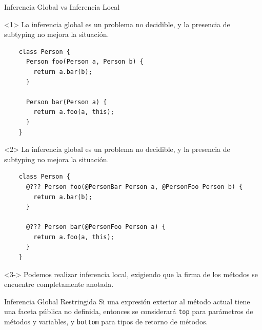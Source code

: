 \documentclass[aspectratio=169,10pt]{beamer}
\begin{document}
\begin{frame}[fragile]{Inferencia Global vs Inferencia Local}

  \begin{onlyenv}<1>
		\only<2-|handout:0>{\stepcounter{framenumber}}
    La inferencia global es un problema no decidible, y la presencia de subtyping no mejora la situación.
    \begin{lstlisting}
    class Person {
      Person foo(Person a, Person b) {
        return a.bar(b);
      }

      Person bar(Person a) {
        return a.foo(a, this);
      }
    }
    \end{lstlisting}
  \end{onlyenv}
  \begin{onlyenv}<2>
    La inferencia global es un problema no decidible, y la presencia de subtyping no mejora la situación.
    \begin{lstlisting}
    class Person {
      @??? Person foo(@PersonBar Person a, @PersonFoo Person b) {
        return a.bar(b);
      }

      @??? Person bar(@PersonFoo Person a) {
        return a.foo(a, this);
      }
    }
    \end{lstlisting}
  \end{onlyenv}

  \begin{onlyenv}<3->
    Podemos realizar inferencia local, exigiendo que la firma de los métodos se encuentre completamente anotada.
  \end{onlyenv}

\end{frame}

\begin{frame}[fragile]{Inferencia Global Restringida}
  Si una expresión exterior al método actual tiene una faceta pública no definida, entonces se considerará \texttt{top} para parámetros de métodos y variables, y \texttt{bottom} para tipos de retorno de métodos.

  \begin{itemize}
  \end{itemize}

\end{frame}
\end{document}
